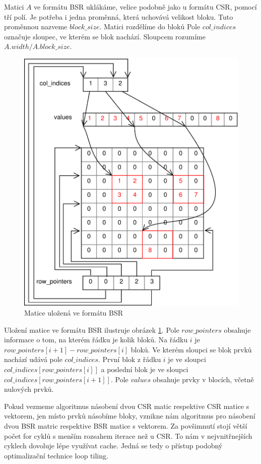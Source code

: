 Matici $A$ ve formátu BSR uklákáme, velice podobně jako u formátu CSR, pomocí tří polí. Je potřeba i jedna proměnná, která uchovává velikost bloku. Tuto proměnnou nazveme $block\_size$. Matici rozdělíme do bloků Pole $col\_indices$ označuje sloupec, ve kterém se blok nachází. Sloupcem rozumíme $A.width / A.block\_size$.

\begin{figure}[H]\centering
	\includegraphics[width=\textwidth]{./images/bsr/bsr}
	\caption{Matice uložená ve formátu BSR}
	\label{fig:BSR}
\end{figure}

Uložení matice ve formátu BSR ilustruje obrázek \ref{fig:BSR}. Pole $row\_pointers$ obsahuje informace o tom, na kterém řádku je kolik bloků. Na řádku $i$ je $row\_pointers[i+1] - row\_pointers[i]$ bloků. Ve kterém sloupci se blok prvků nachází udává pole $col\_indices$. První blok z řádku $i$ je ve sloupci $col\_indices[row\_pointers[i]]$ a poslední blok je ve sloupci $col\_indices[row\_pointers[i+1]]$. Pole $values$ obsahuje prvky v blocích, včetně nulových prvků.

Pokud vezmeme algoritmus násobení dvou CSR matic respektive CSR matice s vektorem, jen místo prvků násobíme bloky, vznikne nám algoritmus pro násobení dvou BSR matric respektive BSR matice s vektorem. Za povšimnutí stojí větší počet for cyklů s menším rozsahem iterace než u CSR. To nám v nejvnitřnejších cyklech dovoluje lépe využívat cache. Jedná se tedy o přístup podobný optimalizační technice loop tiling.

